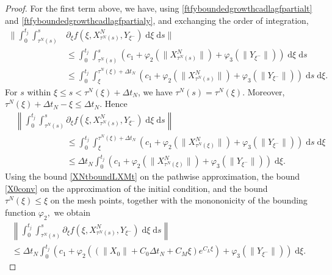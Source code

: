 \documentclass[reqno,12pt]{amsart}
\theoremstyle{plain} %
\theoremstyle{definition} %
\begin{document}
\begin{proof}
    For the first term above, we have, using \eqref{ftfyboundedgrowthcadlagfpartialt} and \eqref{ftfyboundedgrowthcadlagfpartialy}, and exchanging the order of integration,
    \begin{align*}
        \bigg\|\int_0^{t_j} \int_{\tau^N(s)}^s & \partial_\xi f(\xi, X_{\tau^N(s)}^N, Y_{\xi^-}) \;\mathrm{d}\xi\;\mathrm{d}s\bigg\| \\
        & \leq \int_0^{t_j} \int_{\tau^N(s)}^s \left(c_1 + \varphi_2(\|X_{\tau^N(s)}^N\|) + \varphi_3(\|Y_{\xi^-}\|)\right)\;\mathrm{d}\xi\;\mathrm{d}s \\
        & \leq \int_0^{t_j} \int_{\xi}^{\tau^N(\xi) + \Delta t_N} \left(c_1 + \varphi_2(\|X_{\tau^N(s)}^N\|) + \varphi_3(\|Y_{\xi^-}\|)\right)\;\mathrm{d}s\;\mathrm{d}\xi.
    \end{align*}
    For $s$ within $\xi \leq s < \tau^N(\xi) + \Delta t_N$, we have $\tau^N(s) = \tau^N(\xi)$. Moreover, $\tau^N(\xi) + \Delta t_N- \xi \leq \Delta t_N$. Hence
    \begin{align*}
        & \left\|\int_0^{t_j} \int_{\tau^N(s)}^s \partial_\xi f(\xi, X_{\tau^N(s)}^N, Y_{\xi^-})\;\mathrm{d}\xi\;\mathrm{d}s\right\| \\
        & \qquad \qquad \qquad \leq \int_0^{t_j} \int_{\xi}^{\tau^N(\xi) + \Delta t_N} \left(c_1 + \varphi_2(\|X_{\tau^N(\xi)}^N\|) + \varphi_3(\|Y_{\xi^-}\|)\right)\;\mathrm{d}s\;\mathrm{d}\xi \\
        & \qquad \qquad \qquad \leq \Delta t_N\int_0^{t_j} \left(c_1 + \varphi_2(\|X_{\tau^N(\xi)}^N\|) + \varphi_3(\|Y_{\xi^-}\|)\right)\;\mathrm{d}\xi.
    \end{align*}
    Using the bound \eqref{XNtboundLXMt} on the pathwise approximation, the bound \eqref{X0conv} on the approximation of the initial condition, and the bound $\tau^N(\xi)\leq \xi$ on the mesh points, together with the monononicity of the bounding function $\varphi_2,$ we obtain
    \begin{multline*}
        \left\|\int_0^{t_j} \int_{\tau^N(s)}^s \partial_\xi f(\xi, X_{\tau^N(s)}^N, Y_{\xi^-})\;\mathrm{d}\xi\;\mathrm{d}s\right\| \\
        \leq \Delta t_N\int_0^{t_j} \left(c_1 + \varphi_2\left(\left(\|X_0\| + C_0\Delta t_N + C_M \xi \right)e^{C_L \xi}\right) + \varphi_3(\|Y_{\xi^-}\|)\right)\;\mathrm{d}\xi.
    \end{multline*}


\end{proof}
\end{document}
